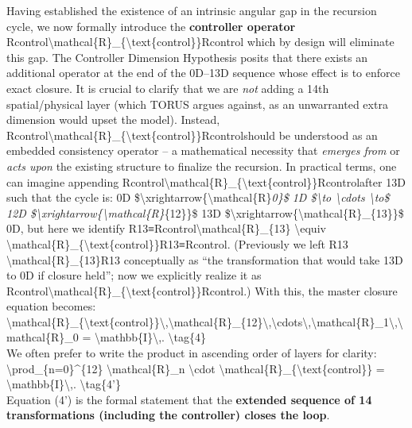 \documentclass[]{article}
\begin{document}
Having established the existence of an intrinsic angular gap in the
recursion cycle, we now formally introduce the \textbf{controller
operator}
Rcontrol\textbackslash{}mathcal\{R\}\_\{\textbackslash{}text\{control\}\}Rcontrol​
which by design will eliminate this gap. The Controller Dimension
Hypothesis posits that there exists an additional operator at the end of
the 0D--13D sequence whose effect is to enforce exact closure. It is
crucial to clarify that we are \emph{not} adding a 14th spatial/physical
layer (which TORUS argues against, as an unwarranted extra dimension
would upset the model​). Instead,
Rcontrol\textbackslash{}mathcal\{R\}\_\{\textbackslash{}text\{control\}\}Rcontrol​
should be understood as an embedded consistency operator -- a
mathematical necessity that \emph{emerges from} or \emph{acts upon} the
existing structure to finalize the recursion. In practical terms, one
can imagine appending
Rcontrol\textbackslash{}mathcal\{R\}\_\{\textbackslash{}text\{control\}\}Rcontrol​
after 13D such that the cycle is: 0D
\$\textbackslash{}xrightarrow\{\textbackslash{}mathcal\{R\}\emph{0\}\$
1D \$\textbackslash{}to \textbackslash{}cdots \textbackslash{}to\$ 12D
\$\textbackslash{}xrightarrow\{\textbackslash{}mathcal\{R\}}\{12\}\}\$
13D
\$\textbackslash{}xrightarrow\{\textbackslash{}mathcal\{R\}\_\{13\}\}\$
0D, but here we identify
R13≡Rcontrol\textbackslash{}mathcal\{R\}\_\{13\} \textbackslash{}equiv
\textbackslash{}mathcal\{R\}\_\{\textbackslash{}text\{control\}\}R13​≡Rcontrol​.
(Previously we left R13 \textbackslash{}mathcal\{R\}\_\{13\}R13​
conceptually as ``the transformation that would take 13D to 0D if
closure held''; now we explicitly realize it as
Rcontrol\textbackslash{}mathcal\{R\}\_\{\textbackslash{}text\{control\}\}Rcontrol​.)
With this, the master closure equation becomes:\\
\textbackslash{}mathcal\{R\}\_\{\textbackslash{}text\{control\}\}\textbackslash{},\textbackslash{}mathcal\{R\}\_\{12\}\textbackslash{},\textbackslash{}cdots\textbackslash{},\textbackslash{}mathcal\{R\}\_1\textbackslash{},\textbackslash{}mathcal\{R\}\_0
= \textbackslash{}mathbb\{I\}\textbackslash{},.
\textbackslash{}tag\{4\}\\
We often prefer to write the product in ascending order of layers for
clarity:\\
\textbackslash{}prod\_\{n=0\}\^{}\{12\} \textbackslash{}mathcal\{R\}\_n
\textbackslash{}cdot
\textbackslash{}mathcal\{R\}\_\{\textbackslash{}text\{control\}\} =
\textbackslash{}mathbb\{I\}\textbackslash{},.
\textbackslash{}tag\{4'\}\\
Equation (4') is the formal statement that the \textbf{extended sequence
of 14 transformations (including the controller) closes the loop}.
\end{document}

